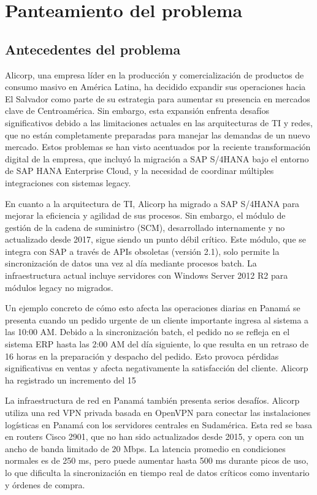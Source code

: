 \section{Panteamiento del problema}
\subsection{Antecedentes del problema}

Alicorp, una empresa líder en la producción y comercialización de productos de consumo masivo en América Latina, ha decidido expandir sus operaciones hacia El Salvador como parte de su estrategia para aumentar su presencia en mercados clave de Centroamérica. Sin embargo, esta expansión enfrenta desafíos significativos debido a las limitaciones actuales en las arquitecturas de TI y redes, que no están completamente preparadas para manejar las demandas de un nuevo mercado. Estos problemas se han visto acentuados por la reciente transformación digital de la empresa, que incluyó la migración a SAP S/4HANA bajo el entorno de SAP HANA Enterprise Cloud, y la necesidad de coordinar múltiples integraciones con sistemas legacy.

En cuanto a la arquitectura de TI, Alicorp ha migrado a SAP S/4HANA para mejorar la eficiencia y agilidad de sus procesos. Sin embargo, el módulo de gestión de la cadena de suministro (SCM), desarrollado internamente y no actualizado desde 2017, sigue siendo un punto débil crítico. Este módulo, que se integra con SAP a través de APIs obsoletas (versión 2.1), solo permite la sincronización de datos una vez al día mediante procesos batch. La infraestructura actual incluye servidores con Windows Server 2012 R2 para módulos legacy no migrados.

Un ejemplo concreto de cómo esto afecta las operaciones diarias en Panamá se presenta cuando un pedido urgente de un cliente importante ingresa al sistema a las 10:00 AM. Debido a la sincronización batch, el pedido no se refleja en el sistema ERP hasta las 2:00 AM del día siguiente, lo que resulta en un retraso de 16 horas en la preparación y despacho del pedido. Esto provoca pérdidas significativas en ventas y afecta negativamente la satisfacción del cliente. Alicorp ha registrado un incremento del 15%

La infraestructura de red en Panamá también presenta serios desafíos. Alicorp utiliza una red VPN privada basada en OpenVPN para conectar las instalaciones logísticas en Panamá con los servidores centrales en Sudamérica. Esta red se basa en routers Cisco 2901, que no han sido actualizados desde 2015, y opera con un ancho de banda limitado de 20 Mbps. La latencia promedio en condiciones normales es de 250 ms, pero puede aumentar hasta 500 ms durante picos de uso, lo que dificulta la sincronización en tiempo real de datos críticos como inventario y órdenes de compra.

